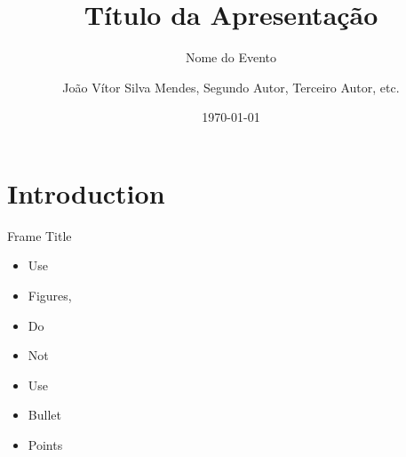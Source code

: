 \documentclass{cubeamer}
\title{Título da Apresentação}
\subtitle{Nome do Evento}
\author[João Vítor Silva Mendes]{João Vítor Silva Mendes, Segundo Autor, Terceiro Autor, etc.}
\date{\today} %
\institute[SENAI CIMATEC]{SENAI CIMATEC - IEEE ROBOTICS AND AUTOMATION SOCIETY}
\begin{document}
\maketitle

\cutoc

\section{Introduction}

\begin{frame}{Frame Title}
    \begin{itemize}
        \item Use
        \item Figures,
        \item Do
        \item Not
        \item Use
        \item Bullet
        \item Points
    \end{itemize}
\end{frame}
\end{document}
